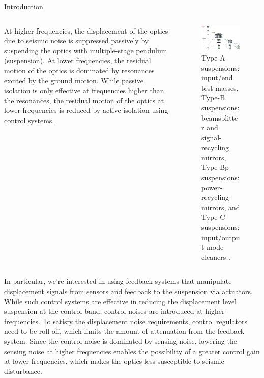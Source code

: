 \documentclass{beamer}
\begin{document}
\begin{frame}[t]
\begin{columns}[t]
\begin{column}{0.32\linewidth}
\begin{block}{Introduction}
				\begin{columns}[t, onlytextwidth]
					\begin{column}{0.4\textwidth}	
						At higher frequencies, the displacement of the optics due to seismic noise is suppressed passively by suspending the optics with multiple-stage pendulum (suspension).
						At lower frequencies, the residual motion of the optics is dominated by resonances excited by the ground motion.
						While passive isolation is only effective at frequencies higher than the resonances, the residual motion of the optics at lower frequencies is reduced by active isolation using control systems.
					\end{column}
					\begin{column}{0.6\textwidth}
						\begin{figure}
							\centering
							\includegraphics[width=0.9\linewidth]{Suspension_types}
							\caption{Type-A suspensions: input/end test masses, Type-B suspensions: beamsplitter and signal-recycling mirrors, Type-Bp suspensions: power-recycling mirrors, and Type-C suspensions: input/output mode cleaners \cite{Akutsu:2021auw}.}
						\end{figure}
					\end{column}
				\end{columns}
				
				\medskip
				
				In particular, we're interested in using feedback systems that manipulate displacement signals from sensors and feedback to the suspension via actuators.
				While such control systems are effective in reducing the displacement level suspension at the control band, control noises are introduced at higher frequencies.
				To satisfy the displacement noise requirements, control regulators need to be roll-off, which limits the amount of attenuation from the feedback system.
				Since the control noise is dominated by sensing noise, lowering the sensing noise at higher frequencies enables the possibility of a greater control gain at lower frequencies, which makes the optics less susceptible to seismic disturbance.	
				

\end{block}
\end{column}
\end{columns}
\end{frame}
\end{document}
